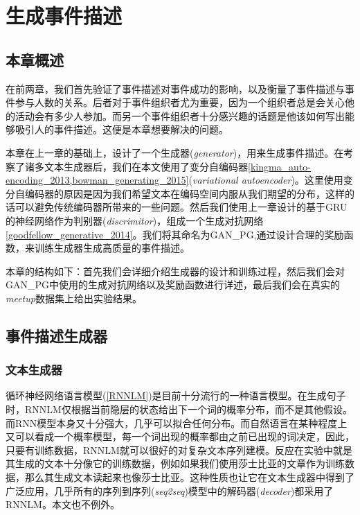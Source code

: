 \documentclass[]{template}
\begin{document}
\section{生成事件描述}
\subsection{本章概述}
在前两章，我们首先验证了事件描述对事件成功的影响，以及衡量了事件描述与事件参与人数的关系。后者对于事件组织者尤为重要，因为一个组织者总是会关心他的活动会有多少人参加。而另一个事件组织者十分感兴趣的话题是他该如何写出能够吸引人的事件描述。这便是本章想要解决的问题。

本章在上一章的基础上，设计了一个生成器(\textit{generator})，用来生成事件描述。在考察了诸多文本生成器后，我们在本文使用了变分自编码器\ref{kingma_auto-encoding_2013,bowman_generating_2015}(\textit{variational autoencoder})。这里使用变分自编码器的原因是因为我们希望文本在编码空间内服从我们期望的分布，这样的话可以避免传统编码器所带来的一些问题。然后我们使用上一章设计的基于GRU的神经网络作为判别器(\textit{discrimitor})，组成一个生成对抗网络\ref{goodfellow_generative_2014}。我们将其命名为GAN\_PG,通过设计合理的奖励函数，来训练生成器生成高质量的事件描述。

本章的结构如下：首先我们会详细介绍生成器的设计和训练过程，然后我们会对GAN\_PG中使用的生成对抗网络以及奖励函数进行详述，最后我们会在真实的\textit{meetup}数据集上给出实验结果。

\subsection{事件描述生成器}
\subsubsection{文本生成器}
循环神经网络语言模型(\ref{RNNLM})是目前十分流行的一种语言模型。在生成句子时，RNNLM仅根据当前隐层的状态给出下一个词的概率分布，而不是其他假设。而RNN模型本身又十分强大，几乎可以拟合任何分布。而自然语言在某种程度上又可以看成一个概率模型，每一个词出现的概率都由之前已出现的词决定，因此，只要有训练数据，RNNLM就可以很好的对复杂文本序列建模。反应在实验中就是其生成的文本十分像它的训练数据，例如如果我们使用莎士比亚的文章作为训练数据，那么其生成文本读起来也像莎士比亚。这种性质也让它在文本生成器中得到了广泛应用，几乎所有的序列到序列(\textit{seq2seq})模型中的解码器(\textit{decoder})都采用了RNNLM。本文也不例外。
\end{document}
